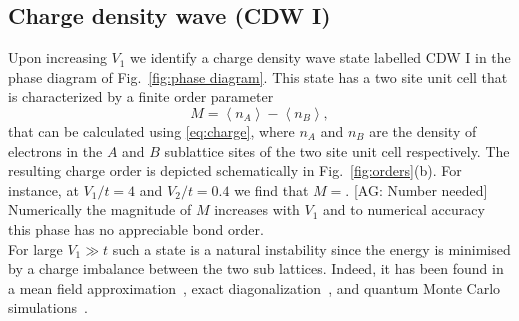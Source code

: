 \documentclass[aps,prx,10pt,twocolumn,floatfix,superscriptaddress,showpacs,numerical,footinbib]{revtex4-1}
\newcommand{\noteAG}[1]{{\color{blue} [AG: #1]}}
\begin{document}
\subsection{Charge density wave (CDW I)}
%
Upon increasing $V_{1}$ we identify a charge density wave state labelled CDW I in the phase diagram of Fig.~\ref{fig:phase diagram}.
%
This state has a two site unit cell that is characterized by a finite order parameter
%
\begin{equation}
\label{eq:CDW}
%
M=\left\langle n_{A} \right\rangle-\left\langle n_{B}\right\rangle,
%
\end{equation}
%
that can be calculated using \eqref{eq:charge}, where $n_{A}$ and $n_{B}$ are the density of electrons in the $A$ and $B$ sublattice sites of the two site unit cell respectively.
%
The resulting charge order is depicted schematically in Fig.~\ref{fig:orders}(b).
%
For instance, at $V_{1}/t = 4$ and $V_{2}/t = 0.4$ we find that $M=$. \noteAG{Number needed}
%
Numerically the magnitude of $M$ increases with $V_{1}$ and to numerical accuracy this phase has no appreciable bond order.\\
For large $V_{1}\gg t$ such a state is a natural instability since the energy is minimised by a charge imbalance between the two sub lattices.
%
Indeed, it has been found in a mean field approximation~\cite{RQHZ08,WF10,GCC13}, exact diagonalization~\cite{GGNVC13,DH14,DCH14}, 
and quantum Monte Carlo simulations~\cite{WCT14}.
%
\end{document}
